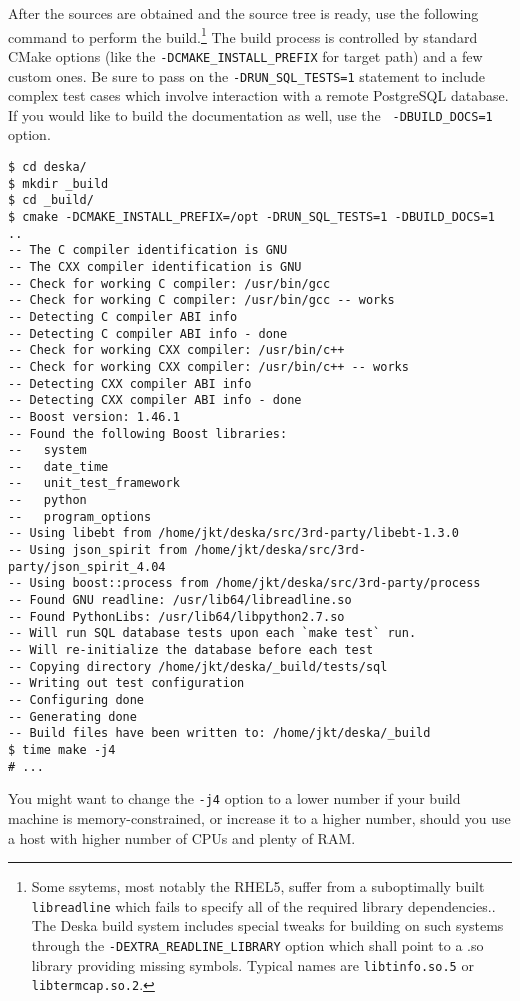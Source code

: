 \documentclass[deska]{subfiles}
\begin{document}
After the sources are obtained and the source tree is ready, use the following command to perform the
build.\footnote{Some ssytems, most notably the RHEL5, suffer from a suboptimally built {\tt libreadline} which fails to
specify all of the required library dependencies.\cite{rhel5-readline-bug}.  The Deska build system includes special
tweaks for building on such systems through the {\tt -DEXTRA\_READLINE\_LIBRARY} option which shall point to a .so
library providing missing symbols.  Typical names are {\tt libtinfo.so.5} or {\tt libtermcap.so.2}.}  The build
process is controlled by standard CMake options (like the {\tt -DCMAKE\_INSTALL\_PREFIX} for target path) and a few
custom ones.  Be sure to pass on the {\tt -DRUN\_SQL\_TESTS=1} statement to include complex test cases which involve
interaction with a remote PostgreSQL database.  If you would like to build the documentation as well, use the {\tt
-DBUILD\_DOCS=1} option.

\begin{verbatim}
$ cd deska/
$ mkdir _build
$ cd _build/
$ cmake -DCMAKE_INSTALL_PREFIX=/opt -DRUN_SQL_TESTS=1 -DBUILD_DOCS=1 ..
-- The C compiler identification is GNU
-- The CXX compiler identification is GNU
-- Check for working C compiler: /usr/bin/gcc
-- Check for working C compiler: /usr/bin/gcc -- works
-- Detecting C compiler ABI info
-- Detecting C compiler ABI info - done
-- Check for working CXX compiler: /usr/bin/c++
-- Check for working CXX compiler: /usr/bin/c++ -- works
-- Detecting CXX compiler ABI info
-- Detecting CXX compiler ABI info - done
-- Boost version: 1.46.1
-- Found the following Boost libraries:
--   system
--   date_time
--   unit_test_framework
--   python
--   program_options
-- Using libebt from /home/jkt/deska/src/3rd-party/libebt-1.3.0
-- Using json_spirit from /home/jkt/deska/src/3rd-party/json_spirit_4.04
-- Using boost::process from /home/jkt/deska/src/3rd-party/process
-- Found GNU readline: /usr/lib64/libreadline.so
-- Found PythonLibs: /usr/lib64/libpython2.7.so
-- Will run SQL database tests upon each `make test` run.
-- Will re-initialize the database before each test
-- Copying directory /home/jkt/deska/_build/tests/sql
-- Writing out test configuration
-- Configuring done
-- Generating done
-- Build files have been written to: /home/jkt/deska/_build
$ time make -j4
# ...
\end{verbatim}

You might want to change the {\tt -j4} option to a lower number if your build machine is memory-constrained, or increase
it to a higher number, should you use a host with higher number of CPUs and plenty of RAM.
\end{document}

